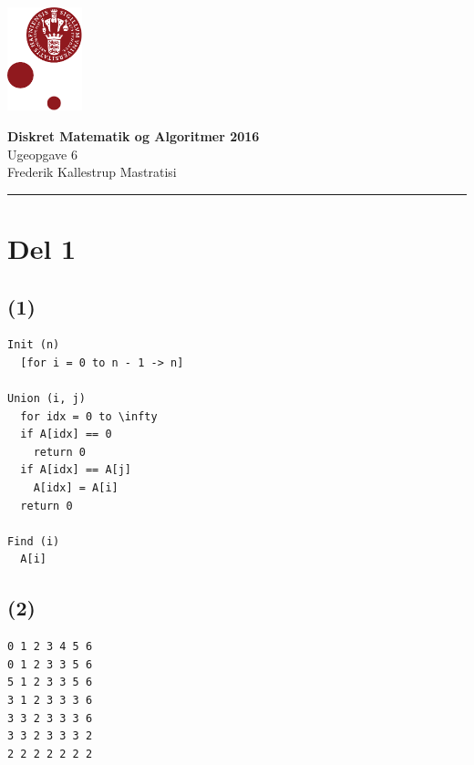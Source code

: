 \documentclass[12pt, a4paper, hidelinks]{article}
\begin{document}
\begin{minipage}[b]{1.0\linewidth}
\includegraphics[height=30mm]{KULogo}

\vspace*{-16ex}
\begin{center}
    {\Large \bf Diskret Matematik og Algoritmer 2016} \vspace*{1ex} \\
    {\large Ugeopgave 6} \vspace*{1ex} \\
    {\large Frederik Kallestrup Mastratisi}
\end{center}
\vspace*{-3pt}
{\color{KU-red}\hrule}
\end{minipage}
\vspace{2ex}

\tableofcontents \newpage

\setcounter{section}{0}
\setcounter{subsection}{-1}

\section{ Del 1}
\subsection{(1)}


\begin{lstlisting}
Init (n)
  [for i = 0 to n - 1 -> n]

Union (i, j)
  for idx = 0 to \infty
  if A[idx] == 0
    return 0
  if A[idx] == A[j]
    A[idx] = A[i]
  return 0

Find (i)
  A[i]  
\end{lstlisting}

\subsection{(2)}

\begin{lstlisting}
0 1 2 3 4 5 6
0 1 2 3 3 5 6
5 1 2 3 3 5 6
3 1 2 3 3 3 6
3 3 2 3 3 3 6
3 3 2 3 3 3 2
2 2 2 2 2 2 2 
\end{lstlisting}
\end{document}
